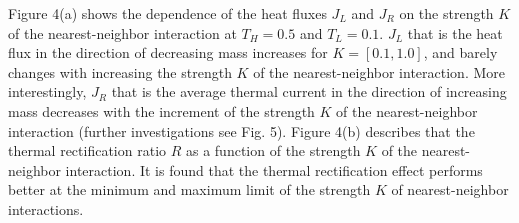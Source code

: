 \documentclass[pra,preprint,superscriptaddress,showkeys,showpacs]{revtex4}
\begin{document}
\indent Figure 4(a) shows the dependence of the heat fluxes $J_{L}$
and $J_{R}$ on the strength $K$ of the nearest-neighbor interaction
at $T_{H}=0.5$ and $T_{L}=0.1$. $J_{L}$ that is the heat flux in the
direction of decreasing mass increases for $K=[0.1, 1.0]$, and
barely changes with increasing the strength $K$ of the
nearest-neighbor interaction. More interestingly, $J_{R}$ that is
the average thermal current in the direction of increasing mass
decreases with the increment of the strength $K$ of the
nearest-neighbor interaction (further investigations see Fig. 5).
Figure 4(b) describes that the thermal rectification ratio $R$ as a
function of the strength $K$ of the nearest-neighbor interaction. It
is found that the thermal rectification effect performs better at
the minimum and maximum limit of the strength $K$ of
nearest-neighbor interactions.\\
\end{document}
